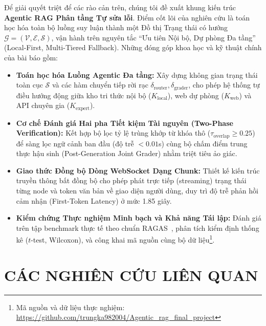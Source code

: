 \documentclass[conference]{IEEEtran}
\begin{document}
Để giải quyết triệt để các rào cản trên, chúng tôi đề xuất khung kiến trúc \textbf{Agentic RAG Phân tầng Tự sửa lỗi}. Điểm cốt lõi của nghiên cứu là toán học hóa toàn bộ luồng suy luận thành một Đồ thị Trạng thái có hướng $\mathcal{G} = (\mathcal{V}, \mathcal{E}, \mathcal{S})$, vận hành trên nguyên tắc ``Ưu tiên Nội bộ, Dự phòng Đa tầng'' (Local-First, Multi-Tiered Fallback). Những đóng góp khoa học và kỹ thuật chính của bài báo gồm:
\begin{itemize}
    \item \textbf{Toán học hóa Luồng Agentic Đa tầng:} Xây dựng không gian trạng thái toàn cục $\mathcal{S}$ và các hàm chuyển tiếp rời rạc $\delta_{\text{router}}, \delta_{\text{grader}}$, cho phép hệ thống tự điều hướng động giữa kho tri thức nội bộ ($K_{\text{local}}$), web dự phòng ($K_{\text{web}}$) và API chuyên gia ($K_{\text{expert}}$).
    \item \textbf{Cơ chế Đánh giá Hai pha Tiết kiệm Tài nguyên (Two-Phase Verification):} Kết hợp bộ lọc tỷ lệ trùng khớp từ khóa thô ($\tau_{\text{overlap}} \ge 0.25$) để sàng lọc ngữ cảnh ban đầu (độ trễ $< 0.01$s) cùng bộ chấm điểm trung thực hậu sinh (Post-Generation Joint Grader) nhằm triệt tiêu ảo giác.
    \item \textbf{Giao thức Đồng bộ Dòng WebSocket Dạng Chunk:} Thiết kế kiến trúc truyền thông bất đồng bộ cho phép phát trực tiếp (streaming) trạng thái từng node và token văn bản về giao diện người dùng, duy trì độ trễ phản hồi cảm nhận (First-Token Latency) ở mức 1.85 giây.
    \item \textbf{Kiểm chứng Thực nghiệm Minh bạch và Khả năng Tái lập:} Đánh giá trên tập benchmark thực tế theo chuẩn RAGAS~\cite{es2023ragas}, phân tích kiểm định thống kê ($t$-test, Wilcoxon), và công khai mã nguồn cùng bộ dữ liệu\footnote{Mã nguồn và dữ liệu thực nghiệm: \url{https://github.com/trungka982004/Agentic_rag_final_project}}.
\end{itemize}

\section{CÁC NGHIÊN CỨU LIÊN QUAN}
\end{document}
